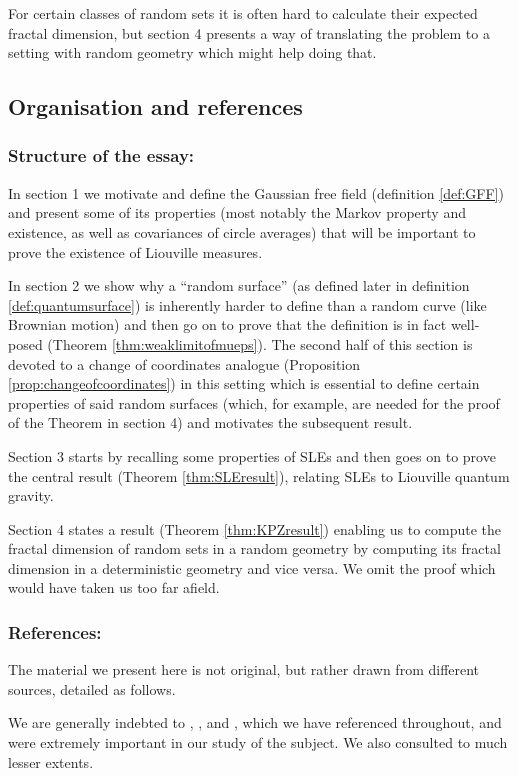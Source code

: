\documentclass[11pt,reqno]{amsart}
\numberwithin{equation}{section}
\begin{document}
For certain classes of random sets it is often hard to calculate their expected fractal dimension, but section 4 presents a way of translating the problem to a setting with random geometry which might help doing that.

\subsection*{Organisation and references}
\subsubsection*{Structure of the essay:} In section 1 we motivate and define the Gaussian free field (definition \ref{def:GFF}) and present some of its properties (most notably the Markov property and existence, as well as covariances of circle averages) that will be important to prove the existence of Liouville measures.

In section 2 we show why a ``random surface'' (as defined later in definition \ref{def:quantumsurface}) is inherently harder to define than a random curve (like Brownian motion) and then go on to prove that the definition is in fact well-posed (Theorem \ref{thm:weaklimitofmueps}).
The second half of this section is devoted to a change of coordinates analogue (Proposition \ref{prop:changeofcoordinates}) in this setting which is essential to define certain properties of said random surfaces (which, for example, are needed for the proof of the Theorem in section 4) and motivates the subsequent result.

Section 3 starts by recalling some properties of SLEs and then goes on to prove the central result (Theorem \ref{thm:SLEresult}), relating SLEs to Liouville quantum gravity.

Section 4 states a result (Theorem \ref{thm:KPZresult}) enabling us to compute the fractal dimension of random sets in a random geometry by computing its fractal dimension in a deterministic geometry and vice versa. We omit the proof which would have taken us too far afield.


\subsubsection*{References:} The material we present here is not original, but rather drawn from  different sources, detailed as follows. 

We are generally indebted to \cite{She07}, \cite{Dup10}, and \cite{She15}, which we have referenced throughout, and were  extremely important in our study of the subject. We also consulted \cite{Dup14} to much lesser extents.
\end{document}
